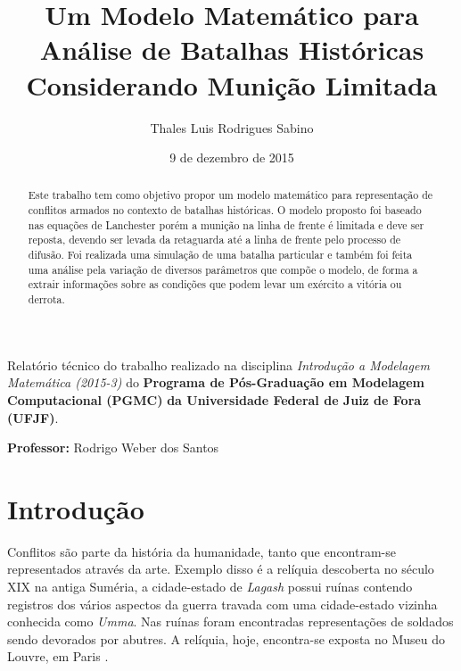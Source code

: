 \documentclass{article}
\title{Um Modelo Matemático para Análise de Batalhas Históricas Considerando Munição Limitada} %
\author{Thales Luis Rodrigues Sabino} %
\date{9 de dezembro de 2015}
\begin{document}
\maketitle %

\begin{center}
Relatório técnico do trabalho realizado na disciplina \textit{Introdução a Modelagem Matemática (2015-3)} do \textbf{Programa de Pós-Graduação em Modelagem Computacional (PGMC)} \textbf{da Universidade Federal de Juiz de Fora (UFJF)}.
\end{center}


\begin{center}
\textbf{Professor:} Rodrigo Weber dos Santos
\end{center}

\begin{abstract}
Este trabalho tem como objetivo propor um modelo matemático para representação de conflitos armados no contexto de batalhas históricas. O modelo proposto foi baseado nas equações de Lanchester porém a munição na linha de frente é limitada e deve ser reposta, devendo ser levada da retaguarda até a linha de frente pelo processo de difusão. Foi realizada uma simulação de uma batalha particular e também foi feita uma análise pela variação de diversos parâmetros que compõe o modelo, de forma a extrair informações sobre as condições que podem levar um exército a vitória ou derrota.
\end{abstract}


\section{Introdução}

Conflitos são parte da história da humanidade, tanto que encontram-se representados através da arte. Exemplo disso é a relíquia descoberta no século XIX na antiga Suméria, a cidade-estado de \textit{Lagash} possui ruínas contendo registros dos vários aspectos da guerra travada com uma cidade-estado vizinha conhecida como \textit{Umma}. Nas ruínas foram encontradas representações de soldados sendo devorados por abutres. A relíquia, hoje, encontra-se exposta no Museu do Louvre, em Paris \cite{firstwar}.
\end{document}
